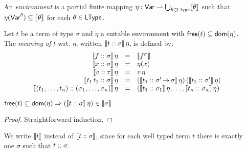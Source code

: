 \documentclass[12pt,a4paper]{article}
\begin{document}
An {\em environment} is a partial finite mapping $\eta:\mathsf{Var} \rightharpoonup \bigcup_{\theta\in\mathsf{LType}}\llbracket\theta\rrbracket$ such
that $\eta(\mathsf{Var}^\theta) \subseteq \llbracket\theta\rrbracket$ for each $\theta\in\mathsf{LType}$.

\begin{definition}
  Let $t$ be a term of type $\sigma$ and $\eta$ a suitable environment with $\mathsf{free}(t) \subseteq \mathsf{dom}(\eta)$.
  The {\em meaning of $t$} wrt. $\eta$, written $\llbracket{t}\mathrel{::}{\sigma}\rrbracket\,\eta$, is defined by:
  \[\begin{array}{rcl}
    \llbracket{f}\mathrel{::}{\sigma}\rrbracket\,\eta
    &=& \llbracket f^\sigma\rrbracket \\
    \llbracket{x}\mathrel{::}{\sigma}\rrbracket\,\eta
    &=& \eta(x) \\
    \llbracket{v}\mathrel{::}{\tau}\rrbracket\,\eta
    &=& v\,\eta \\
    \llbracket{t_1\,t_2}\mathrel{::}{\sigma}\rrbracket\,\eta
    &=& (\llbracket{t_1}\mathrel{::}{\sigma'\operatorname{\dot{\to}}\sigma}\rrbracket\,\eta)\,(\llbracket{t_2}\mathrel{::}{\sigma'}\rrbracket\,\eta) \\
    \llbracket{(t_1,\ldots,t_n)}\mathrel{::}{(\sigma_1,\ldots,\sigma_n)}\rrbracket\,\eta
    &=& (\llbracket{t_1}\mathrel{::}{\sigma_1}\rrbracket\,\eta,\ldots,\llbracket{t_n}\mathrel{::}{\sigma_n}\rrbracket\,\eta) 
  \end{array}\]
\end{definition}

\begin{lemma}
  $\mathsf{free}(t) \subseteq \mathsf{dom}(\eta) \Rightarrow (\llbracket{t}\mathrel{::}{\sigma}\rrbracket\,\eta)\in\llbracket\sigma\rrbracket$
\end{lemma}

\begin{proof}
  Straightforward induction.
\end{proof}

We write $\llbracket t\rrbracket$ instead of $\llbracket{t}\mathrel{::}{\sigma}\rrbracket$, since for each well typed term $t$ there is
exactly one $\sigma$ such that ${t}\mathrel{::}{\sigma}$.
\end{document}
